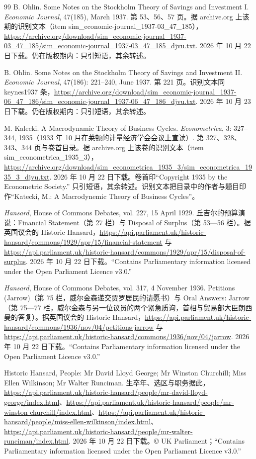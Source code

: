 \begin{thebibliography}{99}
 B. Ohlin. Some Notes on the Stockholm Theory of Savings and Investment I. \emph{Economic Journal}, 47(185), March 1937. 第 53、56、57 页。据 archive.org 上该期的识别文本（item sim\_economic-journal\_1937-03\_47\_185），\url{https://archive.org/download/sim_economic-journal_1937-03_47_185/sim_economic-journal_1937-03_47_185_djvu.txt}. 2026 年 10 月 22 日下载。仍在版权期内：只引短语，其余转述。

 B. Ohlin. Some Notes on the Stockholm Theory of Savings and Investment II. \emph{Economic Journal}, 47(186): 221--240, June 1937. 第 221 页。识别文本同 keynes1937 条，\url{https://archive.org/download/sim_economic-journal_1937-06_47_186/sim_economic-journal_1937-06_47_186_djvu.txt}. 2026 年 10 月 23 日下载。仍在版权期内：只引短语，其余转述。

 M. Kalecki. A Macrodynamic Theory of Business Cycles. \emph{Econometrica}, 3: 327--344, 1935（1933 年 10 月在莱顿的计量经济学会会议上宣读）. 第 327、328、343、344 页与卷首目录。据 archive.org 上该卷的识别文本（item sim\_econometrica\_1935\_3），\url{https://archive.org/download/sim_econometrica_1935_3/sim_econometrica_1935_3_djvu.txt}. 2026 年 10 月 22 日下载。卷首印“Copyright 1935 by the Econometric Society.” 只引短语，其余转述。识别文本把目录中的作者与题目印作“Katecki, M.: A Macrodynemic Theory of Business Cycles”。

 \emph{Hansard}, House of Commons Debates, vol. 227, 15 April 1929. 丘吉尔的预算演说：Financial Statement（第 27 栏）与 Disposal of Surplus（第 53—56 栏）。据英国议会的 Historic Hansard，\url{https://api.parliament.uk/historic-hansard/commons/1929/apr/15/financial-statement} 与 \url{https://api.parliament.uk/historic-hansard/commons/1929/apr/15/disposal-of-surplus}. 2026 年 10 月 22 日下载。“Contains Parliamentary information licensed under the Open Parliament Licence v3.0.”

 \emph{Hansard}, House of Commons Debates, vol. 317, 4 November 1936. Petitions (Jarrow)（第 75 栏，威尔金森递交贾罗居民的请愿书）与 Oral Answers: Jarrow（第 75—77 栏，威尔金森与另一位议员的两个紧急质询，首相与贸易部大臣朗西曼的答复）。据英国议会的 Historic Hansard，\url{https://api.parliament.uk/historic-hansard/commons/1936/nov/04/petitions-jarrow} 与 \url{https://api.parliament.uk/historic-hansard/commons/1936/nov/04/jarrow}. 2026 年 10 月 22 日下载。“Contains Parliamentary information licensed under the Open Parliament Licence v3.0.”

 Historic Hansard, People: Mr David Lloyd George; Mr Winston Churchill; Miss Ellen Wilkinson; Mr Walter Runciman. 生卒年、选区与职务据此，\url{https://api.parliament.uk/historic-hansard/people/mr-david-lloyd-george/index.html}、\url{https://api.parliament.uk/historic-hansard/people/mr-winston-churchill/index.html}、\url{https://api.parliament.uk/historic-hansard/people/miss-ellen-wilkinson/index.html}、\url{https://api.parliament.uk/historic-hansard/people/mr-walter-runciman/index.html}. 2026 年 10 月 22 日下载。© UK Parliament；“Contains Parliamentary information licensed under the Open Parliament Licence v3.0.”


\end{thebibliography}
